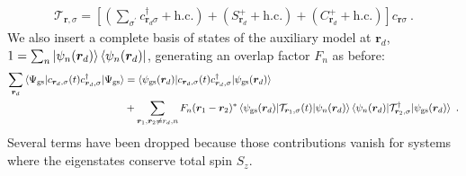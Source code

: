 \begin{equation}\begin{aligned}\label{realLocalInterm}
	\mathcal{T}_{{\bm r},\sigma} = \left[\left(\sum_{\sigma^\prime}c^\dagger_{\bm r_d\sigma} + \text{h.c.}\right) + \left(S_{\bm r_d}^+ + \text{h.c.}\right) + \left(C_{\bm r_d}^+ + \text{h.c.}\right)\right]c_{{\bm r}\sigma}~. %
\end{aligned}\end{equation}
We also insert a complete basis of states of the auxiliary model at \(\bm r_d\), \(1 = \sum_n\ket{\psi_n(\bm r_d)}\bra{\psi_n(\bm r_d)}\), generating an overlap factor \(F_n\) as before:
\begin{equation}\begin{aligned}
	\sum_{\bm r_d}\braket{\Psi_\text{gs} | c_{{\bm r_d},\sigma}(t) c^\dagger_{{\bm r_d},\sigma} | \Psi_\text{gs}} &= \braket{\psi_\text{gs}({\bm r_d}) |  c_{{\bm r_d},\sigma}(t) c^\dagger_{{\bm r_d},\sigma} | \psi_\text{gs}({\bm r_d})}\\
																													  &+\sum_{\bm r_1,\bm r_2 \neq r_d, n}F_n(\bm r_1 - \bm r_2)^*\braket{\psi_\text{gs}({\bm r_d}) | \mathcal{T}_{\bm r_1,\sigma}(t) | \psi_{n}(\bm r_d)} \braket{\psi_{n}(\bm r_d) | \mathcal{T}^\dagger_{\bm r_2,\sigma} | \psi_\text{gs}({\bm r_d})}~.
\end{aligned}\end{equation}
Several terms have been dropped because those contributions vanish for systems where the eigenstates conserve total spin \(S_z\).

